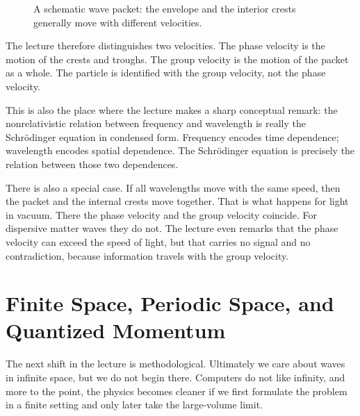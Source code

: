 \begin{figure}[t]
\centering
{}
\caption{A schematic wave packet: the envelope and the interior crests generally move with different velocities.}
\end{figure}

The lecture therefore distinguishes two velocities. The phase velocity is the motion of the crests and troughs. The group velocity is the motion of the packet as a whole. The particle is identified with the group velocity, not the phase velocity.

This is also the place where the lecture makes a sharp conceptual remark: the nonrelativistic relation between frequency and wavelength is really the Schr\"odinger equation in condensed form. Frequency encodes time dependence; wavelength encodes spatial dependence. The Schr\"odinger equation is precisely the relation between those two dependences.

There is also a special case. If all wavelengths move with the same speed, then the packet and the internal crests move together. That is what happens for light in vacuum. There the phase velocity and the group velocity coincide. For dispersive matter waves they do not. The lecture even remarks that the phase velocity can exceed the speed of light, but that carries no signal and no contradiction, because information travels with the group velocity.

\section{Finite Space, Periodic Space, and Quantized Momentum}

The next shift in the lecture is methodological. Ultimately we care about waves in infinite space, but we do not begin there. Computers do not like infinity, and more to the point, the physics becomes cleaner if we first formulate the problem in a finite setting and only later take the large-volume limit.

